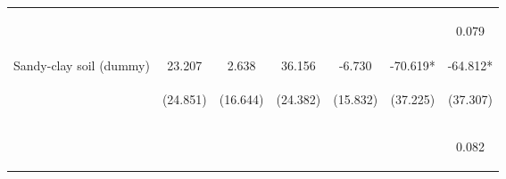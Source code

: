 \begin{center}
\begin{tabular}{lcccccc}
\vspace{4pt} & \begin{footnotesize}[0.877]\end{footnotesize} & \begin{footnotesize}[0.941]\end{footnotesize} & \begin{footnotesize}[0.762]\end{footnotesize} & \begin{footnotesize}[0.663]\end{footnotesize} & \begin{footnotesize}[0.058]\end{footnotesize} & \begin{footnotesize}0.079\end{footnotesize} \\
Sandy-clay soil (dummy) & 23.207 & 2.638 & 36.156 & -6.730 & -70.619* & -64.812* \\
 & \begin{footnotesize}(24.851)\end{footnotesize} & \begin{footnotesize}(16.644)\end{footnotesize} & \begin{footnotesize}(24.382)\end{footnotesize} & \begin{footnotesize}(15.832)\end{footnotesize} & \begin{footnotesize}(37.225)\end{footnotesize} & \begin{footnotesize}(37.307)\end{footnotesize} \\
\vspace{4pt} & \begin{footnotesize}[0.350]\end{footnotesize} & \begin{footnotesize}[0.874]\end{footnotesize} & \begin{footnotesize}[0.138]\end{footnotesize} & \begin{footnotesize}[0.671]\end{footnotesize} & \begin{footnotesize}[0.058]\end{footnotesize} & \begin{footnotesize}0.082\end{footnotesize} \\

\end{tabular}
\end{center}
